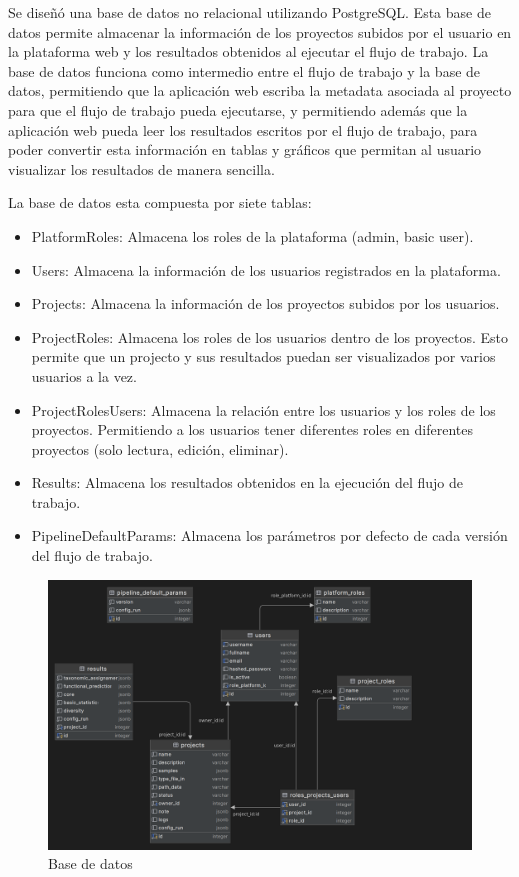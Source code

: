 Se diseñó una base de datos no relacional utilizando PostgreSQL.
Esta base de datos permite almacenar la información de los proyectos subidos por el usuario en la plataforma web y los resultados obtenidos al ejecutar el flujo de trabajo.
La base de datos funciona como intermedio entre el flujo de trabajo y la base de datos, permitiendo que la aplicación web escriba la metadata asociada al proyecto para que el flujo de trabajo pueda ejecutarse, y permitiendo además que la aplicación web pueda leer los resultados escritos por el flujo de trabajo, para poder convertir esta información en tablas y gráficos que permitan al usuario visualizar los resultados de manera sencilla.

La base de datos esta compuesta por siete tablas:
\begin{itemize}
    \item PlatformRoles: Almacena los roles de la plataforma (admin, basic user).
    \item Users: Almacena la información de los usuarios registrados en la plataforma.
    \item Projects: Almacena la información de los proyectos subidos por los usuarios.
    \item ProjectRoles: Almacena los roles de los usuarios dentro de los proyectos. Esto permite que un projecto y sus resultados puedan ser visualizados por varios usuarios a la vez.
    \item ProjectRolesUsers: Almacena la relación entre los usuarios y los roles de los proyectos. Permitiendo a los usuarios tener diferentes roles en diferentes proyectos (solo lectura, edición, eliminar).
    \item Results: Almacena los resultados obtenidos en la ejecución del flujo de trabajo.
    \item PipelineDefaultParams: Almacena los parámetros por defecto de cada versión del flujo de trabajo.
\end{itemize}

\begin{figure}[H]
    \centering
    \includegraphics[width=1\linewidth]{images/dbb.png}
    \caption{Base de datos}
    \label{fig:nanotax-db}
\end{figure}


